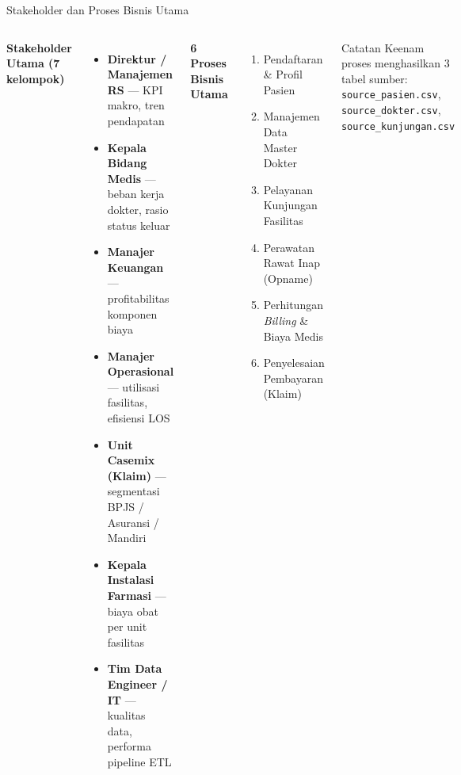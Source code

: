 \documentclass[xcolor=table,t,aspectratio=169]{beamer}
\begin{document}
\begin{frame}{Stakeholder dan Proses Bisnis Utama}
  \footnotesize
  \begin{columns}[T]
    \textbf{Stakeholder Utama (7 kelompok)}
    \begin{itemize}
      \scriptsize
      \item \textbf{Direktur / Manajemen RS} --- KPI makro, tren pendapatan
      \item \textbf{Kepala Bidang Medis} --- beban kerja dokter, rasio status keluar
      \item \textbf{Manajer Keuangan} --- profitabilitas komponen biaya
      \item \textbf{Manajer Operasional} --- utilisasi fasilitas, efisiensi LOS
      \item \textbf{Unit Casemix (Klaim)} --- segmentasi BPJS / Asuransi / Mandiri
      \item \textbf{Kepala Instalasi Farmasi} --- biaya obat per unit fasilitas
      \item \textbf{Tim Data Engineer / IT} --- kualitas data, performa pipeline ETL
    \end{itemize}

    \textbf{6 Proses Bisnis Utama}
    \begin{enumerate}
      \scriptsize
      \item Pendaftaran \& Profil Pasien
      \item Manajemen Data Master Dokter
      \item Pelayanan Kunjungan Fasilitas
      \item Perawatan Rawat Inap (Opname)
      \item Perhitungan \textit{Billing} \& Biaya Medis
      \item Penyelesaian Pembayaran (Klaim)
    \end{enumerate}

    \vspace{6pt}
    \begin{block}{Catatan}
      \tiny
      Keenam proses menghasilkan 3 tabel sumber:\\
      \texttt{source\_pasien.csv}, \texttt{source\_dokter.csv},\\
      \texttt{source\_kunjungan.csv}
    \end{block}
  \end{columns}
\end{frame}

\end{document}
